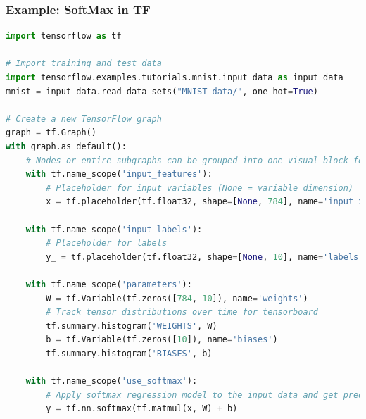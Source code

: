 \begin{frame}[fragile]
  \MyLogo
  \frametitle{Example: SoftMax in TF}  
 
\begin{lstlisting}[language=python]
import tensorflow as tf

# Import training and test data
import tensorflow.examples.tutorials.mnist.input_data as input_data
mnist = input_data.read_data_sets("MNIST_data/", one_hot=True)

# Create a new TensorFlow graph
graph = tf.Graph()
with graph.as_default():
	# Nodes or entire subgraphs can be grouped into one visual block for tensorboard
	with tf.name_scope('input_features'):
		# Placeholder for input variables (None = variable dimension)
		x = tf.placeholder(tf.float32, shape=[None, 784], name='input_x')
							
	with tf.name_scope('input_labels'):
		# Placeholder for labels
		y_ = tf.placeholder(tf.float32, shape=[None, 10], name='labels')
							
	with tf.name_scope('parameters'):
		W = tf.Variable(tf.zeros([784, 10]), name='weights')
		# Track tensor distributions over time for tensorboard
		tf.summary.histogram('WEIGHTS', W)
		b = tf.Variable(tf.zeros([10]), name='biases')
		tf.summary.histogram('BIASES', b)
			
	with tf.name_scope('use_softmax'):
		# Apply softmax regression model to the input data and get prediction y
		y = tf.nn.softmax(tf.matmul(x, W) + b)
\end{lstlisting}

\end{frame}

